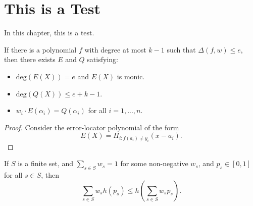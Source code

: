 \chapter{This is a Test}

In this chapter, this is a test.

\begin{lemma}
  \leanok
  If there is a polynomial $f$ with degree at most $k-1$ such that $\Delta(f,w)\leq e$, then there exists $E$ and $Q$ satisfying:
    \begin{itemize}
        \item $\textrm{deg}(E(X))=e$ and $E(X)$ is monic.
        \item $\textrm{deg}(Q(X))\leq e+k-1$.
        \item $w_i\cdot E(\alpha_i)=Q(\alpha_i)$ for all $i=1,...,n$.
    \end{itemize}
\end{lemma}

\begin{proof} \leanok
  Consider the error-locator polynomial of the form
  $$E(X)=\Pi_{i: f(a_i)\neq y_i}(x-a_i).$$
\end{proof}



\begin{lemma}[Jensen]\label{jensen}
   \leanok
  If $S$ is a finite set, and $\sum_{s \in S} w_s = 1$ for some non-negative $w_s$, and $p_s \in [0,1]$ for all $s \in S$, then
  $$ \sum_{s \in S} w_s h(p_s) \leq h(\sum_{s \in S} w_s p_s).$$
\end{lemma}